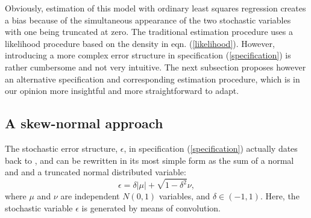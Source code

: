 \documentclass[11pt,parskip,abstracton,notitlepage]{scrartcl}
\begin{document}
Obviously, estimation of this model with ordinary least squares regression creates a bias because of the simultaneous appearance of the two stochastic variables with one being truncated at zero. The traditional estimation procedure uses a likelihood procedure based on the density in eqn. (\ref{likelihood}). However, introducing a more complex error structure in specification (\ref{specification}) is rather cumbersome and not very intuitive. The next subsection proposes however an alternative specification and corresponding estimation procedure, which is in our opinion more insightful and more straightforward to adapt.
%
\subsection{A skew-normal approach}\label{sub:unisn}
%
The stochastic error structure, $\epsilon$, in specification (\ref{specification}) actually dates back to \citet{WEINSTEIN1964}, and can be rewritten in its most simple form as the sum of a normal and and a truncated normal distributed variable:
%
\begin{equation}
\epsilon = \delta|\mu| + \sqrt{1-\delta^2}\nu,
\label{convolution}
\end{equation}
%
where $\mu$ and $\nu$ are independent $N(0,1)$ variables, and $\delta \in (-1,1)$. Here, the stochastic variable $\epsilon $ is generated by means of convolution.
\end{document}
